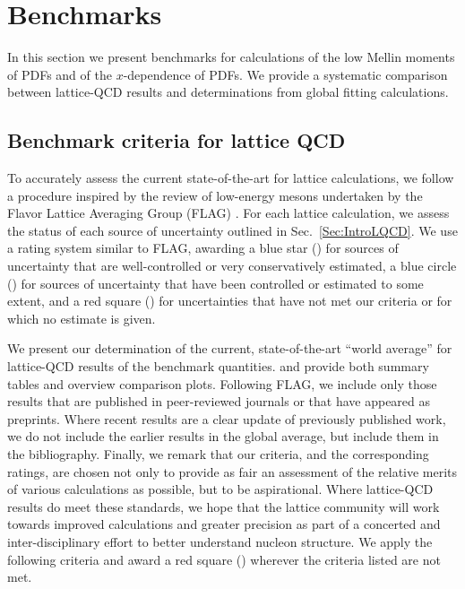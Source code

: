 \section{Benchmarks}
\label{sec:benchmarking}

In this section we present benchmarks for calculations of the low 
Mellin moments of PDFs and of the $x$-dependence of PDFs. We provide a systematic
comparison between lattice-QCD results and determinations from global fitting
calculations.
%
\subsection{Benchmark criteria for lattice QCD}
To accurately assess the current state-of-the-art for lattice calculations, we
follow a procedure inspired by the review of low-energy mesons undertaken 
by the Flavor Lattice Averaging Group (FLAG) \cite{Aoki:2016frl}. For each
lattice calculation, we assess the status of each source of uncertainty outlined
in Sec.~\ref{Sec:IntroLQCD}. We use a rating system similar to FLAG, awarding a
blue star (\bstar) for sources of uncertainty that are well-controlled or very conservatively
estimated, a blue circle (\bcirc) for sources of uncertainty that have been controlled or estimated to some extent,
and a red square (\rsquare) for uncertainties that have not met our criteria or for which no estimate is given.

We present our determination of the current, state-of-the-art
``world average'' for lattice-QCD results of the benchmark quantities. and 
provide both summary tables and overview comparison plots. Following FLAG, we include only those results that
are published in peer-reviewed journals or that have appeared as preprints. Where
recent results are a clear update of previously published work, we do not 
include the earlier results in the global average, but include them in the bibliography. Finally,
we remark that our criteria, and the corresponding ratings, are chosen not only
to provide as fair an assessment of the relative merits of various calculations as
possible, but to be aspirational. Where lattice-QCD results do meet these
standards, we hope that the lattice community will work towards improved calculations
and greater precision as part of a concerted and inter-disciplinary effort to better understand
nucleon structure.
%
We apply the following criteria and award a red square (\rsquare) wherever the criteria listed are not met.
